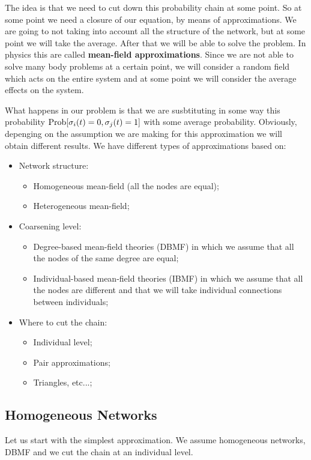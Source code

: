 \documentclass[../main/main.tex]{subfiles}
\begin{document}
The idea is that we need to cut down this probability chain at some point.
So at some point we need a closure of our equation, by means of approximations.
We are going to not taking into account all the structure of the network, but at some point we will take the average.
After that we will be able to solve the problem.
In physics this are called \textbf{mean-field approximations}. Since we are not able to solve many body problems at a certain point, we will consider a random field which acts on the entire system and at some point we will consider the average effects on the system.

What happens in our problem is that we are susbtituting in some way this probability \( \text{Prob} \qty[\sigma _i (t) = 0, \sigma _j (t ) =1 ]  \) with some average probability.
Obviously, depenging on the assumption we are making for this approximation we will obtain different results.
We have different types of approximations based on:
\begin{itemize}
\item Network structure:
    \begin{itemize}
    \item Homogeneous mean-field (all the nodes are equal);
    \item Heterogeneous mean-field;
    \end{itemize}
\item Coarsening level:
    \begin{itemize}
    \item Degree-based mean-field theories (DBMF) in which we assume that all the nodes of the same degree are equal;
    \item Individual-based mean-field theories (IBMF) in which we assume that all the nodes are different and that we will take individual connections between individuals;
    \end{itemize}
\item Where to cut the chain:
    \begin{itemize}
    \item Individual level;
    \item Pair approximations;
    \item Triangles, etc...;
    \end{itemize}
\end{itemize}


\subsection{Homogeneous Networks}
Let us start with the simplest approximation. We assume homogeneous networks, DBMF and we cut the chain at an individual level.
\end{document}
